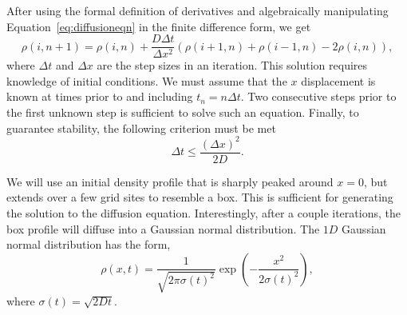 \documentclass[12pt]{article}
\begin{document}
After using the formal definition of derivatives and algebraically manipulating Equation~\ref{eq:diffusioneqn} in the finite difference form, we get
\begin{equation}
  \label{eq:diffusioneqn-iterable}
  \rho(i,n+1) = \rho(i,n) + \frac{D\Delta t}{\Delta x^2}\left(\rho(i+1,n) + \rho(i-1,n) - 2\rho(i,n)\right),
\end{equation}
where $\Delta t$ and $\Delta x$ are the step sizes in an iteration. This solution requires knowledge of initial conditions. We must assume that the $x$ displacement is known at times prior to and including $t_n = n\Delta t$. Two consecutive steps prior to the first unknown step is sufficient to solve such an equation. Finally, to guarantee stability, the following criterion must be met
\begin{equation}
  \label{eq:stabilitycriterion}
  \Delta t \leq \frac{(\Delta x)^2}{2D}.
\end{equation}

We will use an initial density profile that is sharply peaked around $x=0$, but extends over a few grid sites to resemble a box. This is sufficient for generating the solution to the diffusion equation. Interestingly, after a couple iterations, the box profile will diffuse into a Gaussian normal distribution. The $1D$ Gaussian normal distribution has the form,
\begin{equation}
  \label{eq:gaussiandistribution}
  \rho(x,t) = \frac{1}{\sqrt{2\pi\sigma(t)^2}}\exp\left(-\frac{x^2}{2\sigma(t)^2}\right),
\end{equation}
where $\sigma(t) = \sqrt{2Dt}$.
\end{document}
